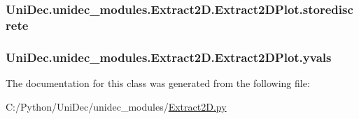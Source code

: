 \subsubsection[{storediscrete}]{\setlength{\rightskip}{0pt plus 5cm}Uni\+Dec.\+unidec\+\_\+modules.\+Extract2\+D.\+Extract2\+D\+Plot.\+storediscrete}\label{class_uni_dec_1_1unidec__modules_1_1_extract2_d_1_1_extract2_d_plot_aef3f73cdaf430e1684959fedca156883}
\hypertarget{class_uni_dec_1_1unidec__modules_1_1_extract2_d_1_1_extract2_d_plot_a4e01f13dd9df45c8baf48d5ad775bf2c}{}
\subsubsection[{yvals}]{\setlength{\rightskip}{0pt plus 5cm}Uni\+Dec.\+unidec\+\_\+modules.\+Extract2\+D.\+Extract2\+D\+Plot.\+yvals}\label{class_uni_dec_1_1unidec__modules_1_1_extract2_d_1_1_extract2_d_plot_a4e01f13dd9df45c8baf48d5ad775bf2c}


The documentation for this class was generated from the following file\+:\begin{DoxyCompactItemize}
\item 
C\+:/\+Python/\+Uni\+Dec/unidec\+\_\+modules/\hyperlink{_extract2_d_8py}{Extract2\+D.\+py}\end{DoxyCompactItemize}

